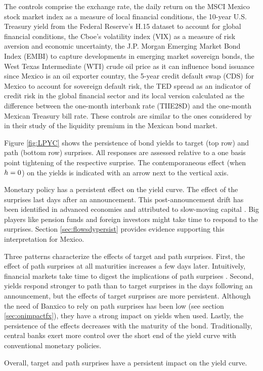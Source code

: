 {The controls comprise the exchange rate, 
the daily return on the MSCI Mexico stock market index as a measure of local financial conditions, 
the 10-year U.S. Treasury yield from the Federal Reserve’s H.15 dataset to account for global financial conditions, 
the Cboe's volatility index (VIX) as a measure of risk aversion and economic uncertainty, 
the J.P. Morgan Emerging Market Bond Index (EMBI) to capture developments in emerging market sovereign bonds, 
the West Texas Intermediate (WTI) crude oil price as it can influence bond issuance since Mexico is an oil exporter country, 
the 5-year credit default swap (CDS) for Mexico to account for sovereign default risk, 
the TED spread as an indicator of credit risk in the global financial sector and 
its local version calculated as the difference between the one-month interbank rate (TIIE28D) and the one-month Mexican Treasury bill rate. 
These controls are similar to the ones considered by \textcite{CFS:2021} in their study of the liquidity premium in the Mexican bond market.

Figure \ref{fig:LPYC} shows the persistence of bond yields to target (top row) and path (bottom row) surprises. 
All responses are assessed relative to a one basis point tightening of the respective surprise. 
The contemporaneous effect (when \(h = 0\)) on the yields is indicated with an arrow next to the vertical axis. 



Monetary policy has a persistent effect on the yield curve. The effect of the surprises last days after an announcement. 
This post-announcement drift has been identified in advanced economies and attributed to slow-moving capital \parencite{BrooksKatzLustig:2019}. 
Big players like pension funds and foreign investors might take time to respond to the surprises. 
Section \ref{sec:flowsdypersist} provides evidence supporting this interpretation for Mexico. 

Three patterns characterize the effects of target and path surprises. 
First, the effect of path surprises at all maturities increases a few days later. Intuitively, financial markets take time to digest the implications of path surprises \parencite{GSS:2005a}. 
Second, yields respond stronger to path than to target surprises in the days following an announcement, but the effects of target surprises are more persistent. Although the need of Banxico to rely on path surprises has been low (see section \ref{sec:onimpactfx}), they have a strong impact on yields when used. 
Lastly, the persistence of the effects decreases with the maturity of the bond. Traditionally, central banks exert more control over the short end of the yield curve with conventional monetary policies. 

Overall, target and path surprises have a persistent impact on the yield curve. 

}{}	%


